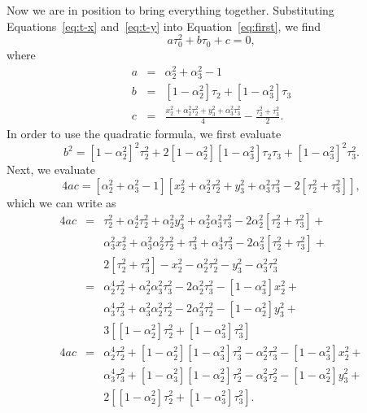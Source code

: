 \documentclass[twocolumn]{article}
\begin{document}
Now we are in position to bring everything together. Substituting
Equations~\ref{eq:t-x} and~\ref{eq:t-y} into Equation~\ref{eq:first}, we find
\begin{equation}
   a\tau_0^2 + b\tau_0 + c = 0,
\end{equation}
where
\begin{eqnarray}
   a &=& \alpha_2^2 + \alpha_3^2 - 1\\[5pt]
   b &=& \left[1 - \alpha_2^2\right]\tau_2 + \left[1 -
         \alpha_3^2\right]\tau_3\\[5pt]
   c &=& \frac{x_2^2 + \alpha_2^2\tau_2^2 + y_3^2 + \alpha_3^2\tau_3^2}{4} -
         \frac{\tau_2^2 + \tau_3^2}{2}.
\end{eqnarray}
In order to use the quadratic formula, we first evaluate
\begin{equation}
   b^2 = \left[1 - \alpha_2^2\right]^2 \tau_2^2 + 2 \left[1 -
   \alpha_2^2\right]\left[1 - \alpha_3^2\right] \tau_2 \tau_3 + \left[1 -
   \alpha_3^2\right]^2 \tau_3^2.
\end{equation}
Next, we evaluate
\begin{equation}
   4ac = \left[\alpha_2^2 + \alpha_3^2 - 1\right] \left[x_2^2 + \alpha_2^2
   \tau_2^2 + y_3^2 + \alpha_3^2 \tau_3^2 - 2\left[\tau_2^2 +
   \tau_3^2\right]\right],
\end{equation}
which we can write as
\begin{eqnarray}
   \nonumber
   4ac &=&
           \tau_2^2 + \alpha_2^4 \tau_2^2 + \alpha_2^2 y_3^2 + \alpha_2^2
           \alpha_3^2 \tau_3^2 - 2 \alpha_2^2 \left[\tau_2^2 + \tau_3^2\right]
           +\\
   \nonumber
   &&
           \alpha_3^2 x_2^2 + \alpha_3^2 \alpha_2^2 \tau_2^2 + \tau_3^2 +
           \alpha_3^4 \tau_3^2 - 2 \alpha_3^2 \left[\tau_2^2 + \tau_3^2\right]
           +\\
   \nonumber
   &&
           2 \left[\tau_2^2 + \tau_3^2\right] - x_2^2 - \alpha_2^2 \tau_2^2 -
           y_3^2 - \alpha_3^2 \tau_3^2\\[5pt]
   \nonumber
   &=&
           \alpha_2^4 \tau_2^2 + \alpha_2^2 \alpha_3^2 \tau_3^2 - 2 \alpha_2^2
           \tau_3^2 - \left[1 - \alpha_3^2\right] x_2^2 +\\
   \nonumber
   &&
           \alpha_3^4 \tau_3^2 + \alpha_3^2 \alpha_2^2 \tau_2^2 - 2 \alpha_3^2
           \tau_2^2 - \left[1 - \alpha_2^2\right] y_3^2 +\\
   \nonumber
   &&
           3 \left[\left[1 - \alpha_2^2\right]\tau_2^2 + \left[1 -
           \alpha_3^2\right] \tau_3^2\right]\\[5pt]
   \nonumber
   4ac &=&
           \alpha_2^4 \tau_2^2 + \left[1 - \alpha_2^2\right] \left[1 -
           \alpha_3^2\right] \tau_3^2 - \alpha_2^2\tau_3^2 - \left[1 -
           \alpha_3^2\right] x_2^2 +\\
   \nonumber
   &&
           \alpha_3^4 \tau_3^2 + \left[1 - \alpha_3^2\right] \left[1 -
           \alpha_2^2\right] \tau_2^2 - \alpha_3^2 \tau_2^2 - \left[1 -
           \alpha_2^2\right] y_3^2 +\\
   &&
           2 \left[\left[1 - \alpha_2^2\right]\tau_2^2 + \left[1 -
           \alpha_3^2\right] \tau_3^2\right].
\end{eqnarray}
\end{document}
